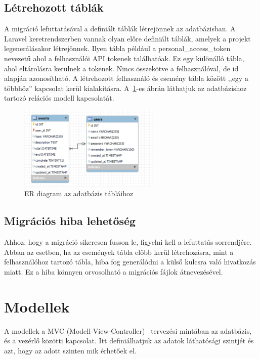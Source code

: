 \documentclass[
]{thesis-ekf}
\theoremstyle{definition}
\theoremstyle{remark}
\begin{document}
	\subsection{Létrehozott táblák}
	A migráció lefuttatásával a definiált táblák létrejönnek az adatbázisban. A Laravel keretrendszerben vannak olyan előre definiált táblák, amelyek a projekt legenerálásakor létrejönnek. Ilyen tábla például a personal\_access\_token nevezetű ahol a felhasználói API tokenek találhatóak. Ez egy különálló tábla, ahol eltárolásra kerülnek a tokenek. Nincs összekötve a felhasználóval, de id alapján azonosítható. A létrehozott felhasználó és esemény tábla között ,,egy a többhöz'' kapcsolat kerül kialakításra. A~\ref{figure:eer_diagram}-es ábrán láthatjuk az adatbázishoz tartozó relációs modell kapcsolatát.
	
	\begin{figure}[ht!]
		\centering
		\includegraphics[width=0.6\textwidth]{database/EER_diagram}
		\caption{ER diagram az adatbázis tábláihoz}
		\label{figure:eer_diagram}
	\end{figure}
	
	\subsection{Migrációs hiba lehetőség}
	Ahhoz, hogy a migráció sikeresen fusson le, figyelni kell a lefuttatás sorrendjére. Abban az esetben, ha az események tábla előbb kerül létrehozásra, mint a felhasználóhoz tartozó tábla, hiba fog generálódni a külső kulcsra való hivatkozás miatt. Ez a hiba könnyen orvosolható a migrációs fájlok átnevezésével.
	
	\section{Modellek}
	A modellek a MVC (Modell-View-Controller)~\cite{mvc_mozzilla} tervezési mintában az adatbázis, és a vezérlő közötti kapcsolat. Itt definiálhatjuk az adatok láthatósági szintjét és azt, hogy az adott szinten mik érhetőek el.
	
\end{document}
